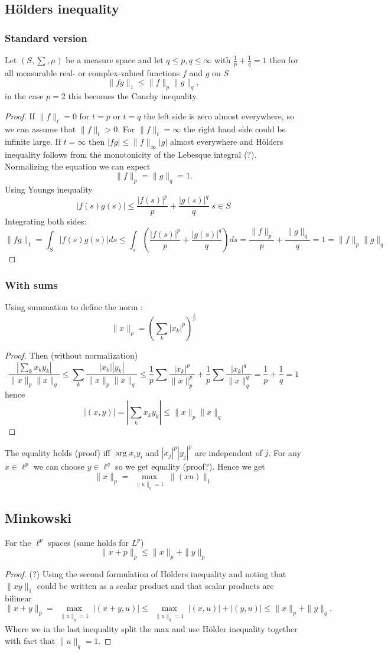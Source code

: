 \documentclass[titlepage]{article}
\begin{document}
\subsection{Hölders inequality}
\subsubsection{Standard version}
Let $(S,\sum, \mu)$ be a measure space and let $q \leq p, q \leq \infty$ with $\frac{1}{p}+ \frac{1}{q} = 1$ then for all measurable real- or complex-valued functions $f$ and $g$ on $S$
$$\|fg\|_1 \leq \|f\|_p \|g\|_q,$$
in the case $p = 2$ this becomes the Cauchy inequality.
\begin{proof}
If $\|f\|_{t} = 0$ for $t = p$ or $t = q$ the left side is zero almost everywhere, so we can assume that $\|f\|_t > 0$. For $\|f\|_{t}= \infty$ the right hand side could be infinite large. 
If $t = \infty$ then $|fg|\leq\|f\|_\infty|g|$ almost everywhere and Hölders inequality follows from the monotonicity of the Lebesque integral (?). Normalizing the equation we can expect
$$\|f\|_p = \|g\|_q = 1.$$
Using Youngs inequality
$$|f(s) g(s)| \leq \frac{|f(s)|^p}{p} + \frac{|g(s)| ^q}{q} \; s\in S$$
Integrating both sides:
$$\|fg\|_1 = \int_S |f(s)g(s)| ds \leq \int_s \left(\frac{|f(s)|^p}{p} + \frac{|g(s)| ^q}{q} \right) ds = \frac{\|f\|_p}{p} + \frac{\|g\|_q}{q} = 1 = \|f\|_p \|g\|_q $$
\end{proof}
\subsubsection{With sums}
Using summation to define the norm :
$$\|x\|_p = \left(\sum_k|x_k|^p\right)^{\frac{1}{p}}$$
\begin{proof}


Then (without normalization)
$$\frac{|\sum_kx_ky_k|}{\|x\|_p\|x\|_q} \leq  \sum_k\frac{|x_k||y_k|}{\|x\|_p\|x\|_q} \leq  \frac{1}{p}\sum \frac{|x_k|^p}{\|x\|_p^p}+ \frac{1}{p}\sum \frac{|x_k|^q}{\|x\|_q^q} = \frac{1}{p} + \frac{1}{q} = 1$$
hence
$$|(x,y)|= |\sum_kx_ky_k| \leq {\|x\|_p\|x\|_q}$$
\end{proof}
The equality holds (proof) iff  $\arg x_iy_i$  and $|x_j|^p|y_j|^p$ are independent of $j$. For any $x\in \ell^p$ we can choose $y\in \ell^q$ so we get equality (proof?). Hence we get 
 $$ \|x\|_p = \max\limits_{\substack{\|u\|_q = 1}}\|(xu)\|_1$$

\subsection{Minkowski}
For the $\ell^p$ spaces (same holds for $L^p$)
$$\|x+p\|_p \leq\|x\|_p+ \|y\|_p$$
\begin{proof}
(?)
Using the second formulation of Hölders inequality and noting that $\|xy\|_1$ could be written as a scalar product and that scalar products are bilinear
$$\|x+y\|_p = \max\limits_{\substack{\|u\|_q = 1}}|(x+y,u)| \leq
\max\limits_{\substack{\|u\|_q = 1}}|(x,u)|+ |(y,u)| \leq \|x\|_p +\|y\|_q.$$
Where we in the last inequality split the max and use Hölder inequality together with fact that $\|u\|_q = 1.$
\end{proof}
\end{document}
